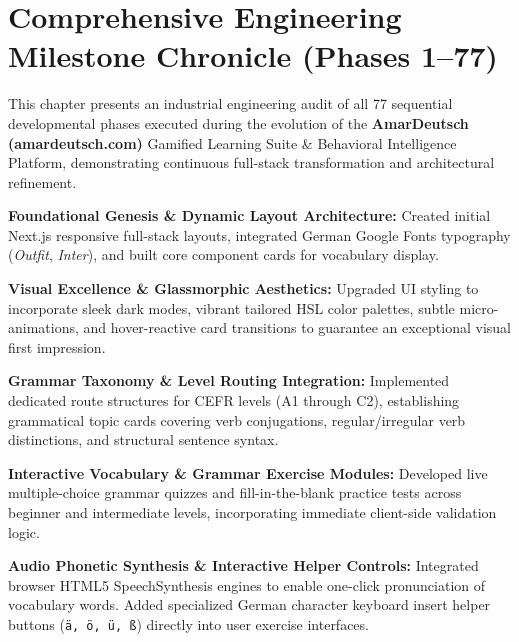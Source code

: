 \documentclass[12pt,a4paper]{article}
\begin{document}
\section{Comprehensive Engineering Milestone Chronicle (Phases 1--77)}

This chapter presents an industrial engineering audit of all 77 sequential developmental phases executed during the evolution of the \textbf{AmarDeutsch (amardeutsch.com)} Gamified Learning Suite \& Behavioral Intelligence Platform, demonstrating continuous full-stack transformation and architectural refinement.

\begin{description}[style=multiline, leftmargin=2.5cm, font=\bfseries\color{primaryBlue}]
    \item[Phases 1--15] \textbf{Foundational Genesis \& Dynamic Layout Architecture:} Created initial Next.js responsive full-stack layouts, integrated German Google Fonts typography (\textit{Outfit}, \textit{Inter}), and built core component cards for vocabulary display.
    \item[Phases 16--25] \textbf{Visual Excellence \& Glassmorphic Aesthetics:} Upgraded UI styling to incorporate sleek dark modes, vibrant tailored HSL color palettes, subtle micro-animations, and hover-reactive card transitions to guarantee an exceptional visual first impression.
    \item[Phases 26--35] \textbf{Grammar Taxonomy \& Level Routing Integration:} Implemented dedicated route structures for CEFR levels (A1 through C2), establishing grammatical topic cards covering verb conjugations, regular/irregular verb distinctions, and structural sentence syntax.
    \item[Phases 36--45] \textbf{Interactive Vocabulary \& Grammar Exercise Modules:} Developed live multiple-choice grammar quizzes and fill-in-the-blank practice tests across beginner and intermediate levels, incorporating immediate client-side validation logic.
    \item[Phases 46--53] \textbf{Audio Phonetic Synthesis \& Interactive Helper Controls:} Integrated browser HTML5 SpeechSynthesis engines to enable one-click pronunciation of vocabulary words. Added specialized German character keyboard insert helper buttons (\texttt{\"a, \"o, \"u, \ss}) directly into user exercise interfaces.

\end{description}
\end{document}

